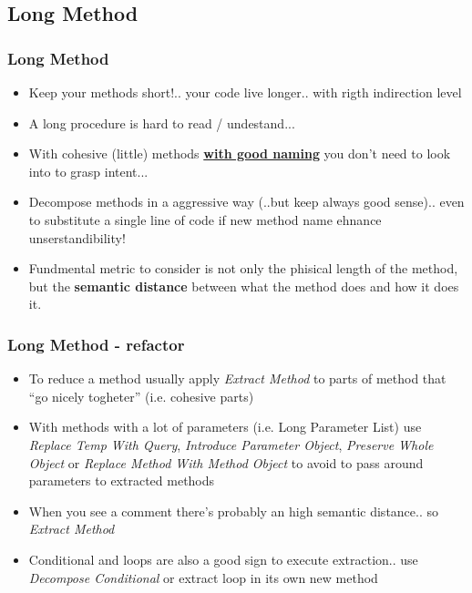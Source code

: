 \documentclass{beamer}
\begin{document}
\subsection{Long Method}
\begin{frame}
  \frametitle{Long Method}
  \begin{itemize}
	\item<+-> Keep your methods short!.. your code live longer.. with rigth indirection level 
	\item<+-> A long procedure is hard to read / undestand...
	\item<+-> With cohesive (little) methods \underline{\textbf{with good naming}} you don't need to look into to grasp intent...
	\item<+-> Decompose methods in a aggressive way (..but keep always good sense).. even to substitute a single line of code if new method name ehnance unserstandibility!
	\item<+-> Fundmental metric to consider is not only the phisical length of the method, but the \textbf{semantic distance} between what the method does and how it does it.
  \end{itemize}
\end{frame}


\begin{frame}
  \frametitle{Long Method - refactor}
  \begin{itemize}
	\item<+-> To reduce a method usually apply \textit{Extract Method} to parts of method that ``go nicely togheter'' (i.e. cohesive parts) 
	\item<+-> With methods with a lot of parameters (i.e. Long Parameter List) use \textit{Replace Temp With Query}, \textit{Introduce Parameter Object}, \textit{Preserve Whole Object} or \textit{Replace Method With Method Object} to avoid to pass around parameters to extracted methods
	\item<+-> When you see a comment there's probably an high semantic distance.. so \textit{Extract Method}  
	\item<+-> Conditional and loops are also a good sign to execute extraction.. use \textit{Decompose Conditional} or extract loop in its own new method
  \end{itemize}
\end{frame}
\end{document}
